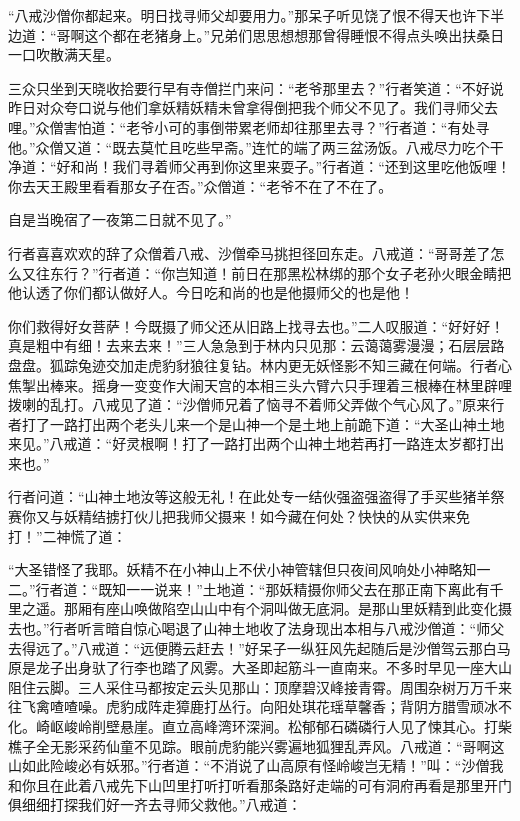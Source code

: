 \documentclass[12pt,UTF8]{ctexbook}
\begin{document}
{	“八戒沙僧你都起来。明日找寻师父却要用力。”那呆子听见饶了恨不得天也许下半边道：“哥啊这个都在老猪身上。”兄弟们思思想想那曾得睡恨不得点头唤出扶桑日一口吹散满天星。
	
	三众只坐到天晓收拾要行早有寺僧拦门来问：“老爷那里去？”行者笑道：“不好说昨日对众夸口说与他们拿妖精妖精未曾拿得倒把我个师父不见了。我们寻师父去哩。”众僧害怕道：“老爷小可的事倒带累老师却往那里去寻？”行者道：“有处寻他。”众僧又道：“既去莫忙且吃些早斋。”连忙的端了两三盆汤饭。八戒尽力吃个干净道：“好和尚！我们寻着师父再到你这里来耍子。”行者道：“还到这里吃他饭哩！你去天王殿里看看那女子在否。”众僧道：“老爷不在了不在了。
	
	自是当晚宿了一夜第二日就不见了。”
	
	行者喜喜欢欢的辞了众僧着八戒、沙僧牵马挑担径回东走。八戒道：“哥哥差了怎么又往东行？”行者道：“你岂知道！前日在那黑松林绑的那个女子老孙火眼金睛把他认透了你们都认做好人。今日吃和尚的也是他摄师父的也是他！
	
	你们救得好女菩萨！今既摄了师父还从旧路上找寻去也。”二人叹服道：“好好好！真是粗中有细！去来去来！”三人急急到于林内只见那：云蔼蔼雾漫漫；石层层路盘盘。狐踪兔迹交加走虎豹豺狼往复钻。林内更无妖怪影不知三藏在何端。行者心焦掣出棒来。摇身一变变作大闹天宫的本相三头六臂六只手理着三根棒在林里辟哩拨喇的乱打。八戒见了道：“沙僧师兄着了恼寻不着师父弄做个气心风了。”原来行者打了一路打出两个老头儿来一个是山神一个是土地上前跪下道：“大圣山神土地来见。”八戒道：“好灵根啊！打了一路打出两个山神土地若再打一路连太岁都打出来也。”
	
	行者问道：“山神土地汝等这般无礼！在此处专一结伙强盗强盗得了手买些猪羊祭赛你又与妖精结掳打伙儿把我师父摄来！如今藏在何处？快快的从实供来免打！”二神慌了道：
	
	“大圣错怪了我耶。妖精不在小神山上不伏小神管辖但只夜间风响处小神略知一二。”行者道：“既知一一说来！”土地道：“那妖精摄你师父去在那正南下离此有千里之遥。那厢有座山唤做陷空山山中有个洞叫做无底洞。是那山里妖精到此变化摄去也。”行者听言暗自惊心喝退了山神土地收了法身现出本相与八戒沙僧道：“师父去得远了。”八戒道：“远便腾云赶去！”好呆子一纵狂风先起随后是沙僧驾云那白马原是龙子出身驮了行李也踏了风雾。大圣即起筋斗一直南来。不多时早见一座大山阻住云脚。三人采住马都按定云头见那山：顶摩碧汉峰接青霄。周围杂树万万千来往飞禽喳喳噪。虎豹成阵走獐鹿打丛行。向阳处琪花瑶草馨香；背阴方腊雪顽冰不化。崎岖峻岭削壁悬崖。直立高峰湾环深涧。松郁郁石磷磷行人见了悚其心。打柴樵子全无影采药仙童不见踪。眼前虎豹能兴雾遍地狐狸乱弄风。八戒道：“哥啊这山如此险峻必有妖邪。”行者道：“不消说了山高原有怪岭峻岂无精！”叫：“沙僧我和你且在此着八戒先下山凹里打听打听看那条路好走端的可有洞府再看是那里开门俱细细打探我们好一齐去寻师父救他。”八戒道：
	
}
\end{document}

